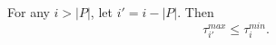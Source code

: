\begin{claim}\label{claim:min-propagation}
For any $i>|P|$, let $i' = i-|P|$. Then
\[
\tau^{max}_{i'} \le \tau^{min}_i.
\]
\end{claim}

